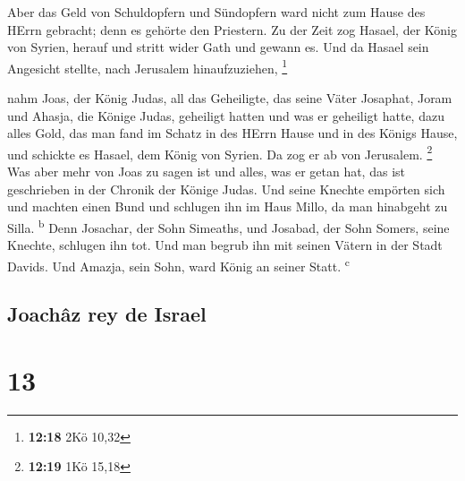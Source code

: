  Aber das Geld von Schuldopfern und Sündopfern ward nicht
zum Hause des HErrn gebracht; denn es gehörte den Priestern.
 Zu der Zeit zog Hasael, der König von Syrien, herauf und
stritt wider Gath und gewann es. Und da Hasael sein Angesicht stellte,
nach Jerusalem hinaufzuziehen, \footnote{\textbf{12:18} 2Kö 10,32}

 nahm Joas, der König Judas, all das Geheiligte, das
seine Väter Josaphat, Joram und Ahasja, die Könige Judas, geheiligt
hatten und was er geheiligt hatte, dazu alles Gold, das man fand im
Schatz in des HErrn Hause und in des Königs Hause, und schickte es
Hasael, dem König von Syrien. Da zog er ab von Jerusalem. \footnote{\textbf{12:19}
  1Kö 15,18}  Was aber mehr von Joas zu sagen ist und
alles, was er getan hat, das ist geschrieben in der Chronik der Könige
Judas.  Und seine Knechte empörten sich und machten einen
Bund und schlugen ihn im Haus Millo, da man hinabgeht zu Silla.
\textsuperscript{b}  Denn Josachar, der Sohn Simeaths,
und Josabad, der Sohn Somers, seine Knechte, schlugen ihn tot. Und man
begrub ihn mit seinen Vätern in der Stadt Davids. Und Amazja, sein Sohn,
ward König an seiner Statt. \textsuperscript{c}

\hypertarget{joachuxe2z-rey-de-israel}{%
\subsection{Joachâz rey de Israel}\label{joachuxe2z-rey-de-israel}}

\hypertarget{section-12}{%
\section{13}\label{section-12}}

